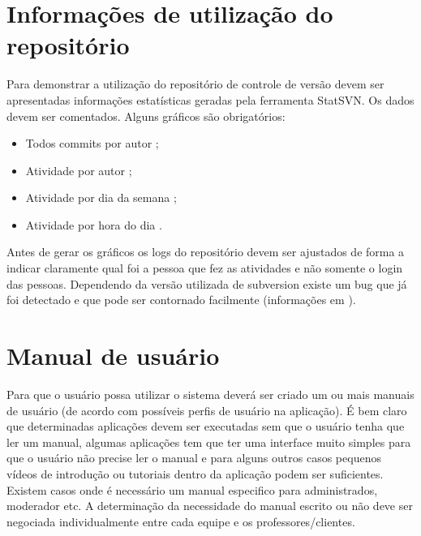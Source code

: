 \section{Informações de utilização do repositório}\label{atv-estatisticas-repositorio}

Para demonstrar a utilização do repositório de controle de versão devem ser apresentadas informações estatísticas geradas pela ferramenta StatSVN. Os dados devem ser comentados. Alguns gráficos são obrigatórios:
    \begin{itemize}
        \item Todos commits por autor ;
        
        \item Atividade por autor ;
        
        \item Atividade por dia da semana
        ;
        
        \item Atividade por hora do dia .
    \end{itemize}

Antes de gerar os gráficos os logs do repositório devem ser ajustados de forma a indicar claramente qual foi a pessoa que fez as atividades e não somente o login das pessoas. Dependendo da versão utilizada de subversion existe um bug que já foi detectado e que pode ser contornado facilmente (informações em ).




\section{Manual de usuário}\label{atv-manual-usuario}
Para que o usuário possa utilizar o sistema deverá ser criado um ou mais manuais de usuário (de acordo com possíveis perfis de usuário na aplicação). É bem claro que determinadas aplicações devem ser executadas sem que o usuário tenha que ler um manual, algumas aplicações tem que ter uma interface muito simples para que o usuário não precise ler o manual e para alguns outros casos pequenos vídeos de introdução ou tutoriais dentro da aplicação podem ser suficientes. Existem casos onde é necessário um manual especifico para administrados, moderador etc. A determinação da necessidade do manual escrito ou não deve ser negociada individualmente entre cada equipe e os professores/clientes.


